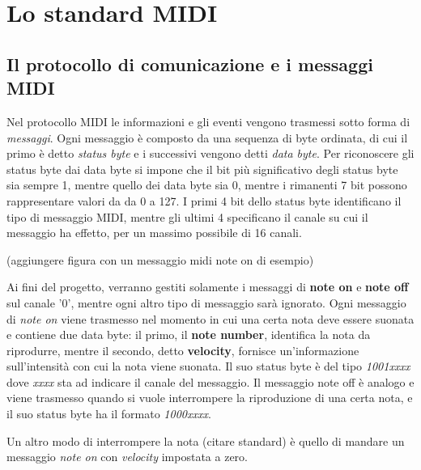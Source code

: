 \chapter{Lo standard MIDI}
\label{chap:midi}

\section{Il protocollo di comunicazione e i messaggi MIDI}
Nel protocollo MIDI le informazioni e gli eventi vengono trasmessi sotto forma di \textit{messaggi}.
Ogni messaggio è composto da una sequenza di byte ordinata, di cui il primo è detto \textit{status byte} e i successivi
vengono detti \textit{data byte}.
Per riconoscere gli status byte dai data byte si impone che il bit più significativo degli status byte sia sempre 1, mentre quello dei data byte sia 0,
mentre i rimanenti 7 bit possono rappresentare valori da da 0 a 127.
I primi 4 bit dello status byte identificano il tipo di messaggio MIDI, mentre gli ultimi 4 specificano il canale su cui il messaggio ha effetto,
per un massimo possibile di 16 canali.

(aggiungere figura con un messaggio midi note on di esempio)

Ai fini del progetto, verranno gestiti solamente i messaggi di \textbf{note on} e \textbf{note off} sul canale '0', mentre
ogni altro tipo di messaggio sarà ignorato.
Ogni messaggio di \textit{note on} viene trasmesso nel momento in cui una certa nota deve essere suonata e contiene due data byte: 
il primo, il \textbf{note number}, identifica la nota da riprodurre, mentre il secondo, detto \textbf{velocity}, fornisce un'informazione
sull'intensità con cui la nota viene suonata. Il suo status byte è del tipo
\textit{1001xxxx} dove \textit{xxxx} sta ad indicare il canale del
messaggio.
Il messaggio note off è analogo e viene trasmesso quando si vuole
interrompere la riproduzione di una certa nota, e il suo status byte
ha il formato \textit{1000xxxx}.

Un altro modo di interrompere la nota (citare standard) è quello di mandare
un messaggio \textit{note on} con \textit{velocity} impostata a zero.

\pagebreak


